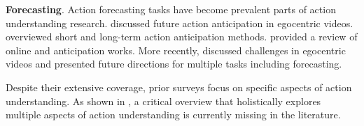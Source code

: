 \noindent
\textbf{Forecasting}. Action forecasting tasks have become prevalent parts of action understanding research. \citet{rodin2021predicting} discussed future action anticipation in egocentric videos. \citet{zhong2023survey} overviewed short and long-term action anticipation methods. \citet{hu2022online} provided a review of online and anticipation works. More recently, \citet{plizzari2024outlook} discussed challenges in egocentric videos and presented future directions for multiple tasks including forecasting.


  
Despite their extensive coverage, prior surveys focus on specific aspects of action understanding. As shown in , a critical overview that holistically explores multiple aspects of action understanding is currently missing in the literature. 



